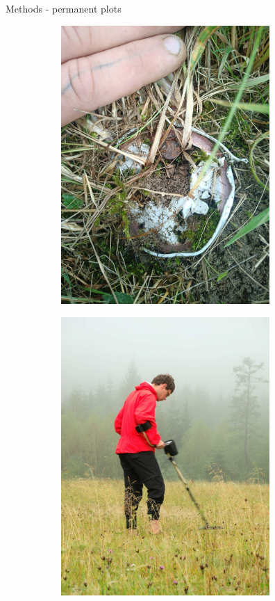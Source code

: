 \documentclass[
  ignorenonframetext,
  aspectratio=169,
]{beamer}
\begin{document}
\begin{frame}{}
\begin{block}{Methods - permanent plots}
\begin{figure}
\begin{minipage}{0.33\linewidth}
\begin{figure}[H]
{\centering \includegraphics[width=3.125in,height=\textheight,keepaspectratio]{images/Picture3.jpg}

}

\end{figure}%

\end{minipage}%
%
\begin{minipage}{0.33\linewidth}

\begin{figure}[H]


{\centering \includegraphics[width=3.125in,height=\textheight,keepaspectratio]{images/Picture2.jpg}

}
\end{figure}
\end{minipage}
\end{figure}
\end{block}
\end{frame}
\end{document}

